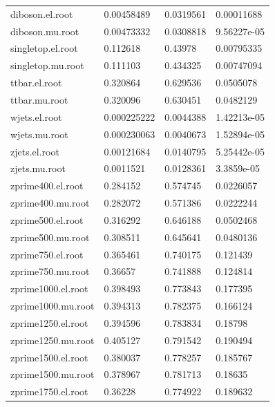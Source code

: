 \begin{table}[H]
\begin{tabular}{l|lll}
  diboson.el.root    & 0.00458489  & 0.0319561 &    0.00011688         \\
  diboson.mu.root    & 0.00473332  & 0.0308818 &    9.56227e-05         \\
  singletop.el.root  & 0.112618    & 0.43978   &    0.00795335         \\
  singletop.mu.root  & 0.111103    & 0.434325  &    0.00747094         \\
  ttbar.el.root      & 0.320864    & 0.629536  &    0.0505078         \\
  ttbar.mu.root      & 0.320096    & 0.630451  &    0.0482129         \\
  wjets.el.root      & 0.000225222 & 0.0044388 &    1.42213e-05         \\
  wjets.mu.root      & 0.000230063 & 0.0040673 &    1.52894e-05         \\
  zjets.el.root      & 0.00121684  & 0.0140795 &    5.25442e-05         \\
  zjets.mu.root      & 0.0011521   & 0.0128361 &    3.3859e-05         \\
  zprime400.el.root  & 0.284152    & 0.574745  &    0.0226057         \\
  zprime400.mu.root  & 0.282072    & 0.571386  &    0.0222244         \\
  zprime500.el.root  & 0.316292    & 0.646188  &    0.0502468         \\
  zprime500.mu.root  & 0.308511    & 0.645641  &    0.0480136         \\
  zprime750.el.root  & 0.365461    & 0.740175  &    0.121439         \\
  zprime750.mu.root  & 0.36657     & 0.741888  &    0.124814         \\
  zprime1000.el.root & 0.398493    & 0.773843  &    0.177395         \\
  zprime1000.mu.root & 0.394313    & 0.782375  &    0.166124         \\
  zprime1250.el.root & 0.394596    & 0.783834  &    0.18798         \\
  zprime1250.mu.root & 0.405127    & 0.791542  &    0.190494         \\
  zprime1500.el.root & 0.380037    & 0.778257  &    0.185767         \\
  zprime1500.mu.root & 0.378967    & 0.781713  &    0.18635         \\
  zprime1750.el.root & 0.36228     & 0.774922  &    0.189632         \\

\end{tabular}
\end{table}
